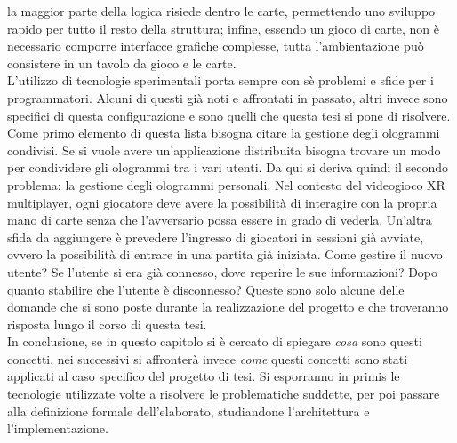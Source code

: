         la maggior parte della logica risiede dentro le carte, permettendo uno sviluppo rapido per tutto il resto della struttura; infine, essendo un gioco di carte, non è necessario
        comporre interfacce grafiche complesse, tutta l'ambientazione può consistere in un tavolo da gioco e le carte.\\
        \newline
        L'utilizzo di tecnologie sperimentali porta sempre con sè problemi e sfide per i programmatori. Alcuni di questi già noti e affrontati in passato, altri
        invece sono specifici di questa configurazione e sono quelli che questa tesi si pone di risolvere. Come primo elemento di questa lista bisogna citare la gestione degli 
        ologrammi condivisi. Se si vuole avere un'applicazione distribuita bisogna trovare un modo per condividere gli ologrammi tra i vari utenti. Da qui si deriva quindi il secondo
        problema: la gestione degli ologrammi personali. Nel contesto del videogioco XR multiplayer, ogni giocatore deve avere la possibilità di interagire con la propria mano
        di carte senza che l'avversario possa essere in grado di vederla. Un'altra sfida da aggiungere è prevedere l'ingresso di giocatori in sessioni già avviate,
        ovvero la possibilità di entrare in una partita già iniziata. Come gestire il nuovo utente? Se l'utente si era già connesso, dove reperire le sue informazioni? Dopo quanto
        stabilire che l'utente è disconnesso? Queste sono solo alcune delle domande che si sono poste durante la realizzazione del progetto e che troveranno risposta lungo il corso
        di questa tesi.\\
        \newline
        In conclusione, se in questo capitolo si è cercato di spiegare \textit{cosa} sono questi concetti, nei successivi si affronterà invece \textit{come} questi concetti sono 
        stati applicati al caso specifico del progetto di tesi. Si esporranno in primis le tecnologie utilizzate volte a risolvere le problematiche suddette, per poi passare alla 
        definizione formale dell'elaborato, studiandone l'architettura e l'implementazione.
        